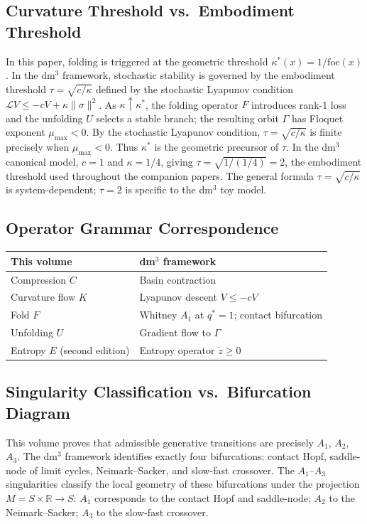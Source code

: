 \documentclass[14pt,a4paper]{extarticle}
\begin{document}
\subsection{Curvature Threshold vs.\ Embodiment Threshold}

In this paper, folding is triggered at the geometric threshold
$\kappa^*(x) = 1/\mathrm{foc}(x)$.
In the dm$^3$ framework, stochastic stability is governed by the
embodiment threshold $\tau = \sqrt{c/\kappa}$ defined by the stochastic
Lyapunov condition $\mathcal{L}V \leq -cV + \kappa\|\sigma\|^2$.
As $\kappa \uparrow \kappa^*$, the folding operator $F$ introduces
rank-1 loss and the unfolding $U$ selects a stable branch; the
resulting orbit $\Gamma$ has Floquet exponent $\mu_{\max} < 0$.
By the stochastic Lyapunov condition, $\tau = \sqrt{c/\kappa}$ is
finite precisely when $\mu_{\max} < 0$.
Thus $\kappa^*$ is the geometric precursor of $\tau$.
In the dm$^3$ canonical model, $c=1$ and $\kappa=1/4$,
giving $\tau = \sqrt{1/(1/4)} = 2$, the embodiment threshold
used throughout the companion papers.
The general formula $\tau=\sqrt{c/\kappa}$ is system-dependent;
$\tau = 2$ is specific to the dm$^3$ toy model.

\subsection{Operator Grammar Correspondence}

\begin{center}
\small
\begin{tabular}{ll}
\toprule
This volume & dm$^3$ framework \\
\midrule
Compression $C$ & Basin contraction \\
Curvature flow $K$ & Lyapunov descent $\dot{V} \leq -cV$ \\
Fold $F$ & Whitney $A_1$ at $q^* = 1$; contact bifurcation \\
Unfolding $U$ & Gradient flow to $\Gamma$ \\
Entropy $E$ (second edition) & Entropy operator $\dot{z} \geq 0$ \\
\bottomrule
\end{tabular}
\end{center}

\subsection{Singularity Classification vs.\ Bifurcation Diagram}

This volume proves that admissible generative transitions are precisely
$A_1$, $A_2$, $A_3$.
The dm$^3$ framework identifies exactly four bifurcations: contact
Hopf, saddle-node of limit cycles, Neimark--Sacker, and slow-fast
crossover.
The $A_1$--$A_3$ singularities classify the local geometry of these
bifurcations under the projection $M = S \times \mathbb{R} \to S$:
$A_1$ corresponds to the contact Hopf and saddle-node;
$A_2$ to the Neimark--Sacker;
$A_3$ to the slow-fast crossover.
\end{document}
